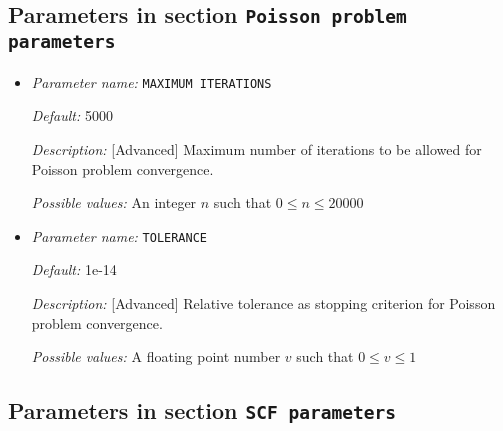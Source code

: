 \subsection{Parameters in section \tt Poisson problem parameters}
\label{parameters:Poisson_20problem_20parameters}

\begin{itemize}
\item {\it Parameter name:} {\tt MAXIMUM ITERATIONS}
\label{parameters:Poisson problem parameters/MAXIMUM ITERATIONS}
\label{parameters:Poisson_20problem_20parameters/MAXIMUM_20ITERATIONS}




{\it Default:} 5000


{\it Description:} [Advanced] Maximum number of iterations to be allowed for Poisson problem convergence.


{\it Possible values:} An integer $n$ such that $0\leq n \leq 20000$
\item {\it Parameter name:} {\tt TOLERANCE}
\label{parameters:Poisson problem parameters/TOLERANCE}
\label{parameters:Poisson_20problem_20parameters/TOLERANCE}




{\it Default:} 1e-14


{\it Description:} [Advanced] Relative tolerance as stopping criterion for Poisson problem convergence.


{\it Possible values:} A floating point number $v$ such that $0 \leq v \leq 1$
\end{itemize}

\subsection{Parameters in section \tt SCF parameters}
\label{parameters:SCF_20parameters}

